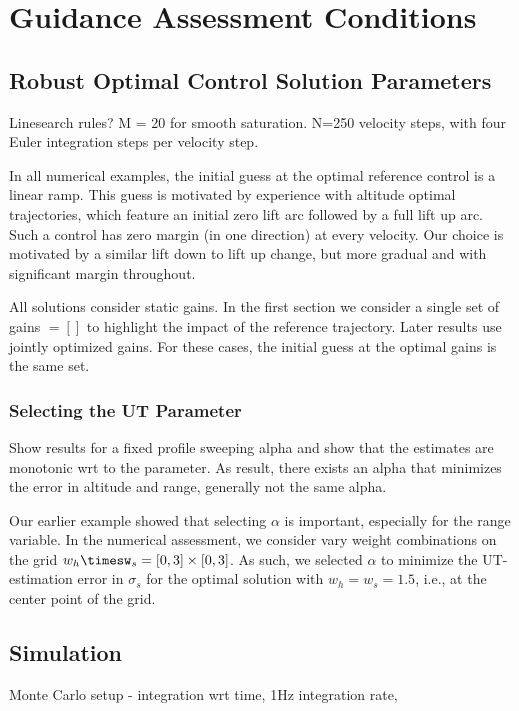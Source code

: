 \chapter{Guidance Assessment Conditions}\label{Ch:AssessmentConditions}

\section{Robust Optimal Control Solution Parameters}
Linesearch rules? M = 20 for smooth saturation. N=250 velocity steps, with four Euler integration steps per velocity step. 

In all numerical examples, the initial guess at the optimal reference control is a linear ramp. This guess is motivated by experience with altitude optimal trajectories, which feature an initial zero lift arc followed by a full lift up arc. Such a control has zero margin (in one direction) at every velocity. Our choice is motivated by a similar lift down to lift up change, but more gradual and with significant margin throughout. 

All solutions consider static gains. In the first section we consider a single set of gains $=[]$ to highlight the impact of the reference trajectory. Later results use jointly optimized gains. For these cases, the initial guess at the optimal gains is the same set.

\subsection{Selecting the UT Parameter}
Show results for a fixed profile sweeping alpha and show that the estimates are monotonic wrt to the parameter. As result, there exists an alpha that minimizes the error in altitude and range, generally not the same alpha. 

Our earlier example showed that selecting $\alpha$ is important, especially for the range variable. In the numerical assessment, we consider vary weight combinations on the grid $w_h\timesw_s = [0,3]\times[0,3]$. As such, we selected $\alpha$ to minimize the UT-estimation error in $\sigma_s$ for the optimal solution with $w_h=w_s=1.5$, i.e., at the center point of the grid. 

\section{Simulation}
Monte Carlo setup - integration wrt time, 1Hz integration rate, 

